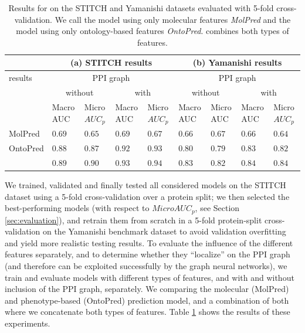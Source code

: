 \documentclass{bioinfo}
\begin{document}
\begin{table}[ht]
  \centering
  \begin{tabular}{|p{1.1cm}|p{0.6cm}|p{0.7cm}|p{0.6cm}|p{0.7cm}|p{0.6cm}|p{0.7cm}|p{0.6cm}|p{0.7cm}|}
    \hline
    &\multicolumn{4}{c|}{(a) STITCH results}& \multicolumn{4}{c|}{(b) Yamanishi results}\\
    \hline
    \name{} results&\multicolumn{4}{c|}{PPI graph}&\multicolumn{4}{c|}{PPI graph}\\
    &\multicolumn{2}{c|}{without}&\multicolumn{2}{c|}{with}&\multicolumn{2}{c|}{without}&\multicolumn{2}{c|}{with}\\
    &Macro AUC&Micro $AUC_p$&Macro AUC&Micro $AUC_p$&Macro AUC&Micro AUC&Macro AUC&Micro $AUC_p$\\
    \hline
    MolPred&$0.69$&$0.65$&$0.69$&$0.67$&$0.66$&$0.67$&$0.66$&$0.64$\\
    \hline
    OntoPred&$0.88$&$0.87$&$0.92$&$0.93$&$0.80$&$0.79$&$0.83$&$0.82$\\
    \hline
    \name{} & $0.89$ & $0.90$&$\mathbf{0.93}$&$\mathbf{0.94}$& $0.83$ & $0.82$&$\mathbf{0.84}$&$\mathbf{0.84}$\\
    \hline
  \end{tabular}
  \caption{\label{tab:Results}Results for \name{} on the STITCH
    and Yamanishi datasets evaluated with 5-fold cross-validation. We 
    call the model using only molecular features
    \textit{MolPred} and the model using only ontology-based
    features \textit{OntoPred}. \name{} combines both types of
    features.}
\end{table}

We trained, validated and finally tested all considered models on the
STITCH dataset using a 5-fold cross-validation over a protein split;
we then selected the best-performing models (with respect to
$MicroAUC_p$, see Section \ref{sec:evaluation}), and retrain them from
scratch in a 5-fold protein-split cross-validation on the Yamanishi
benchmark dataset to avoid validation overfitting and yield more
realistic testing results. To evaluate the influence of the different
features separately, and to determine whether they ``localize'' on the
PPI graph (and therefore can be exploited successfully by the graph
neural networks), we train and evaluate models with different types of
features, and with and without inclusion of the PPI graph,
separately. We comparing the molecular (MolPred) and phenotype-based
(OntoPred) prediction model, and a combination of both where we
concatenate both types of features. Table \ref{tab:Results} shows the
results of these experiments.
\end{document}

